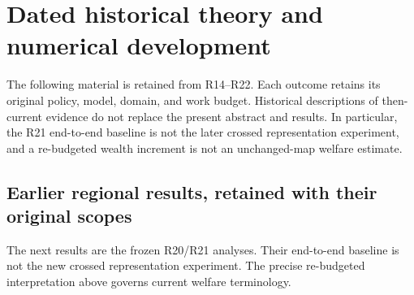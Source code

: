 \clearpage
\section{Dated historical theory and numerical development}\label{app:r23history}
The following material is retained from R14--R22. Each outcome retains its original policy, model, domain, and work budget. Historical descriptions of then-current evidence do not replace the present abstract and results. In particular, the R21 end-to-end baseline is not the later crossed representation experiment, and a re-budgeted wealth increment is not an unchanged-map welfare estimate.
\begingroup
\let\historicalsection\subsection
\let\historicalsubsection\subsubsection
\let\section\historicalsection
\let\subsection\historicalsubsection

\section{Earlier regional results, retained with their original scopes}
The next results are the frozen R20/R21 analyses. Their end-to-end baseline is not the new crossed representation experiment. The precise re-budgeted interpretation above governs current welfare terminology.



